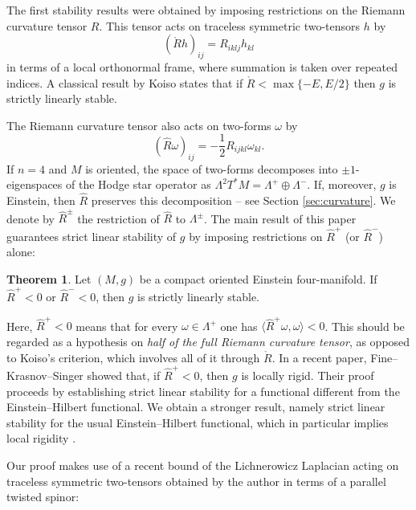 \documentclass[oneside,12pt]{amsart}
\theoremstyle{definition}
\newtheorem{theorem}[lemma]{Theorem}
\numberwithin{equation}{section}
\begin{document}
The first stability results were obtained by imposing restrictions on the Riemann curvature tensor $R$. This tensor acts on traceless symmetric two-tensors $h$ by 
\[
(\mathring{R}h)_{ij} = R_{iklj} h_{kl}
\]
in terms of a local orthonormal frame, where summation is taken over repeated indices. A classical result by Koiso \cite{K78} states that if $\mathring{R} < \max\{-E , E/2\}$ then $g$ is strictly linearly stable. 

The Riemann curvature tensor also acts on two-forms $\omega$ by 
\[
(\widehat{R} \omega)_{ij} = -\frac{1}{2} R_{ijkl} \omega_{kl} . 
\]
If $n=4$ and $M$ is oriented, the space of two-forms decomposes into $\pm 1$-eigenspaces of the Hodge star operator as $\Lambda^2 T^*M = \Lambda^+ \oplus \Lambda^-$. If, moreover, $g$ is Einstein, then $\widehat{R}$ preserves this decomposition -- see Section \ref{sec:curvature}. We denote by $\widehat{R}^{\pm}$ the restriction of $\widehat{R}$ to $\Lambda^{\pm}$. The main result of this paper guarantees strict linear stability of $g$ by imposing restrictions on $\widehat{R}^+$ (or $\widehat{R}^-$) alone: 

\begin{theorem}\label{thm:main}
Let $(M,g)$ be a compact oriented Einstein four-manifold. If $\widehat{R}^+ < 0$ or $\widehat{R}^- < 0$, then $g$ is strictly linearly stable. 
\end{theorem}

Here, $\widehat{R}^+ < 0$ means that for every $\omega \in \Lambda^+$ one has $\langle \widehat{R}^+ \omega , \omega \rangle < 0$. This should be regarded as a hypothesis on \emph{half of the full Riemann curvature tensor}, as opposed to Koiso's criterion, which involves all of it through $\mathring{R}$. In a recent paper, Fine--Krasnov--Singer \cite{FKS} showed that, if $\widehat{R}^+<0$, then $g$ is locally rigid. Their proof proceeds by establishing strict linear stability for a functional different from the Einstein–Hilbert functional. We obtain a stronger result, namely strict linear stability for the usual Einstein–Hilbert functional, which in particular implies local rigidity \cite{DWW05,DK24}. 

Our proof makes use of a recent bound of the Lichnerowicz Laplacian acting on traceless symmetric two-tensors obtained by the author \cite{A25} in terms of a parallel twisted spinor: 
\end{document}

